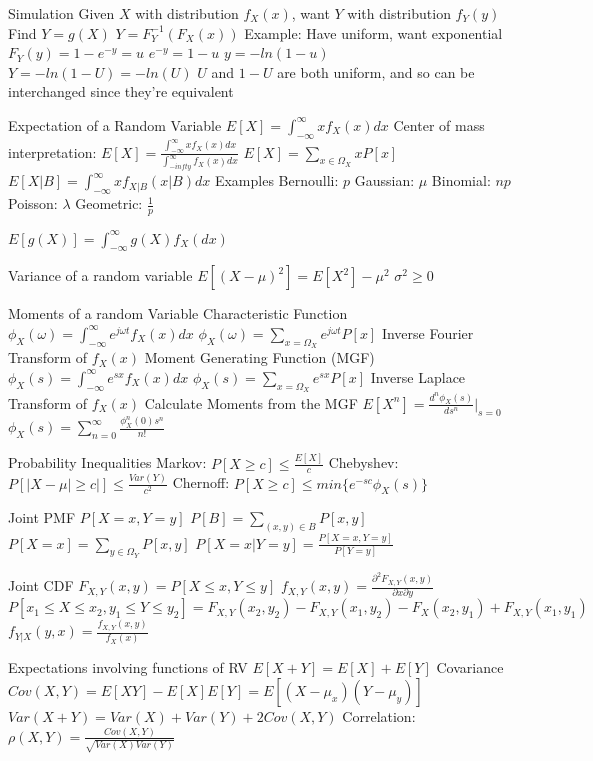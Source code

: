 \documentclass[14pt]{extarticle}
\begin{document}
\begin{outline}
		\1	Simulation
			\2	Given $X$ with distribution $f_X(x)$, want $Y$ with distribution $f_Y(y)$
			\2	Find $Y = g(X)$ 
			\2	$Y = F_Y^{-1}(F_X(x))$
			\2	Example:	Have uniform, want exponential
				\3	$F_Y(y) = 1 - e^{-y} = u$
				\3	$e^{-y} = 1 - u$
				\3	$y = -ln(1 - u)$
				\3	$Y = -ln(1 - U) = -ln(U)$
					\4	$U$ and $1 - U$ are both uniform, and so can be interchanged since they're equivalent
	
		\1	Expectation of a Random Variable
			\2	$E[X] = \int_{-\infty}^{\infty}xf_X(x) dx$
				\3	Center of mass interpretation:	
				$E[X] = \frac{\int_{-\infty}^{\infty} xf_X(x)dx}{\int_{-infty}^{\infty} f_X(x)dx}$
			\2	$E[X] = \sum_{x \in \Omega_X}	xP[x]$
			\2	$E[X | B] = \int_{-\infty}^{\infty}x f_{X | B}(x | B)dx$
			\2	Examples
				\3	Bernoulli: $p$
				\3	Gaussian: $\mu$
				\3	Binomial: $n p$
				\3	Poisson: $\lambda$
				\3	Geometric:	$\frac{1}{p}$

			\2	$E[g(X)] = \int_{-\infty}^{\infty}g(X) f_X(dx)$

		\1	Variance of a random variable
			\2	$E[(X - \mu)^2] = E[X^2] - \mu^2$	
			\2	$\sigma^2 \ge 0$
		
		\1	Moments of a random Variable
			\2	Characteristic Function
				\3	$\phi_X(\omega) = \int_{-\infty}^{\infty} e^{j\omega t} f_X(x) dx$
				\3	$\phi_X(\omega) = \sum_{x = \Omega_X}e^{j\omega t} P[x]$
				\3	Inverse Fourier Transform of $f_X(x)$
			\2	Moment Generating Function (MGF)
				\3	$\phi_X(s) = \int_{-\infty}^{\infty} e^{sx} f_X(x) dx$
				\3	$\phi_X(s) = \sum_{x = \Omega_X} e^{sx}P[x]$
				\3	Inverse Laplace Transform of $f_X(x)$
			\2	Calculate Moments from the MGF
				\3	$E[X^n] = \frac{d^n\phi_X(s)}{ds^n}|_{s = 0}$
				\3	$\phi_X(s) = \sum_{n=0}^{\infty} \frac{\phi_X^n(0)s^n}{n!}$

		\1	Probability Inequalities
			\2	Markov:	$P[X \ge c] \le \frac{E[X]}{c}$
			\2	Chebyshev:	$P[|X - \mu| \ge c|] \le \frac{Var(Y)}{c^2}$
			\2	Chernoff:	$P[X \ge c] \le min\{e^{-sc}\phi_X(s)\}$

		\1	Joint PMF
			\2	$P[X = x, Y = y]$
			\2	$P[B] = \sum_{(x,y) \in B}P[x,y]$
			\2	$P[X = x] = \sum_{y \in \Omega_Y}P[x,y]$
			\2	$P[X = x | Y = y] = \frac{P[X=x,Y=y]}{P[Y = y]}$
		
		\1	Joint CDF
			\2	$F_{X,Y}(x,y) = P[X \le x, Y \le y]$
			\2	$f_{X,Y}(x,y) = \frac{\partial^2 F_{X,Y}(x,y)}{\partial x \partial y}$
			\2	$P[x_1 \le X \le x_2, y_1 \le Y \le y_2] =
				F_{X,Y}(x_2,y_2) - F_{X,Y}(x_1,y_2) - F_X(x_2,y_1) + F_{X,Y}(x_1,y_1)$
			\2	$f_{Y | X}(y,x) = \frac{f_{X,Y}(x,y)}{f_X(x)}$

		\1	Expectations involving functions of RV
			\2	$E[X + Y] = E[X] + E[Y]$
		\1	Covariance
			\2	$Cov(X,Y) = E[XY] - E[X]E[Y] = E[(X - \mu_x)(Y - \mu_y)]$ 
			\2	$Var(X + Y) = Var(X) + Var(Y) + 2Cov(X,Y)$
			\2	Correlation:	$\rho(X,Y) = \frac{Cov(X,Y)}{\sqrt{Var(X)Var(Y)}}$
	\end{outline}
\end{document}
